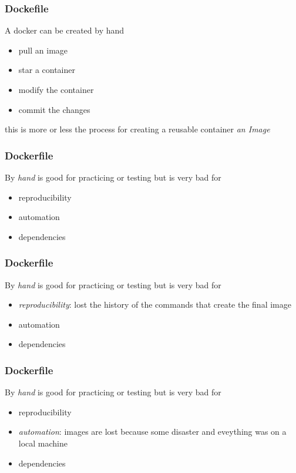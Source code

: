 \begin{frame}
\frametitle{Dockefile}

A docker can be created by hand

\begin{itemize}
\item pull an image
\item star a container
\item modify the container
\item commit the changes 
\end{itemize}

this is more or less the process for creating a reusable container \textit{an Image}
\end{frame}

\begin{frame}
\frametitle{Dockerfile}

By \textit{hand} is good for practicing or testing but is very bad for 
\begin{itemize}
\item reproducibility
\item automation
\item dependencies
\end{itemize}
\end{frame}

\begin{frame}
\frametitle{Dockerfile}

By \textit{hand} is good for practicing or testing but is very bad for 

\begin{itemize}
\item \textit{reproducibility}: lost the history of the commands that create the final image
\item automation
\item dependencies
\end{itemize}
\end{frame}

\begin{frame}
\frametitle{Dockerfile}

By \textit{hand} is good for practicing or testing but is very bad for 

\begin{itemize}
\item reproducibility
\item \textit{automation}: images are lost because some disaster and eveything was on a local machine
\item dependencies
\end{itemize}
\end{frame}

